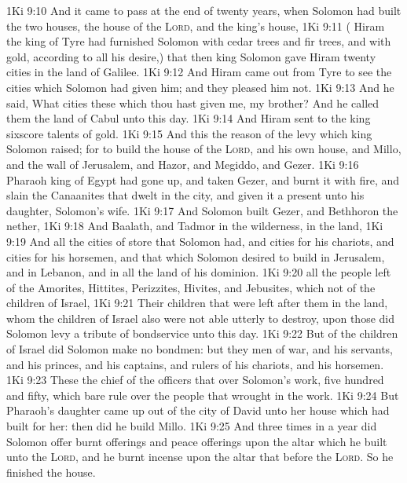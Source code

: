 \vs 1Ki 9:10 And it came to pass at the end of twenty years, when Solomon had built the two houses, the house of the \textsc{Lord}, and the king's house,
\vs 1Ki 9:11 ( Hiram the king of Tyre had furnished Solomon with cedar trees and fir trees, and with gold, according to all his desire,) that then king Solomon gave Hiram twenty cities in the land of Galilee.
\vs 1Ki 9:12 And Hiram came out from Tyre to see the cities which Solomon had given him; and they pleased him not.
\vs 1Ki 9:13 And he said, What cities  these which thou hast given me, my brother? And he called them the land of Cabul unto this day.
\vs 1Ki 9:14 And Hiram sent to the king sixscore talents of gold.
\vs 1Ki 9:15 And this  the reason of the levy which king Solomon raised; for to build the house of the \textsc{Lord}, and his own house, and Millo, and the wall of Jerusalem, and Hazor, and Megiddo, and Gezer.
\vs 1Ki 9:16  Pharaoh king of Egypt had gone up, and taken Gezer, and burnt it with fire, and slain the Canaanites that dwelt in the city, and given it  a present unto his daughter, Solomon's wife.
\vs 1Ki 9:17 And Solomon built Gezer, and Bethhoron the nether,
\vs 1Ki 9:18 And Baalath, and Tadmor in the wilderness, in the land,
\vs 1Ki 9:19 And all the cities of store that Solomon had, and cities for his chariots, and cities for his horsemen, and that which Solomon desired to build in Jerusalem, and in Lebanon, and in all the land of his dominion.
\vs 1Ki 9:20  all the people  left of the Amorites, Hittites, Perizzites, Hivites, and Jebusites, which  not of the children of Israel,
\vs 1Ki 9:21 Their children that were left after them in the land, whom the children of Israel also were not able utterly to destroy, upon those did Solomon levy a tribute of bondservice unto this day.
\vs 1Ki 9:22 But of the children of Israel did Solomon make no bondmen: but they  men of war, and his servants, and his princes, and his captains, and rulers of his chariots, and his horsemen.
\vs 1Ki 9:23 These  the chief of the officers that  over Solomon's work, five hundred and fifty, which bare rule over the people that wrought in the work.
\vs 1Ki 9:24 But Pharaoh's daughter came up out of the city of David unto her house which  had built for her: then did he build Millo.
\vs 1Ki 9:25 And three times in a year did Solomon offer burnt offerings and peace offerings upon the altar which he built unto the \textsc{Lord}, and he burnt incense upon the altar that  before the \textsc{Lord}. So he finished the house.
